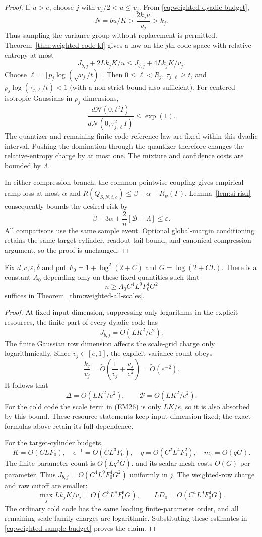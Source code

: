 \begin{proof}
If $u>e$, choose $j$ with $v_j/2<u\le v_j$. From
\eqref{eq:weighted-dyadic-budget},
\[
 N=bu/K>\frac{2k_j u}{v_j}>k_j.
\]
Thus sampling the variance group without replacement is permitted.
Theorem~\ref{thm:weighted-code-kl} gives a law on the $j$th code space
with relative entropy at most
\[
 J_{b,j}+2Lk_jK/u
 \le J_{b,j}+4Lk_jK/v_j.
\]
Choose $\ell=\lfloor p_j\log(\sqrt{v_j}/t)\rfloor$.
Then $0\le\ell<R_j$, $\tau_{j,\ell}\ge t$, and
$p_j\log(\tau_{j,\ell}/t)<1$ (with a non-strict bound also sufficient).
For centered isotropic Gaussians in $p_j$ dimensions,
\[
 \frac{d\mathcal N(0,t^2I)}
      {d\mathcal N(0,\tau_{j,\ell}^2I)}\le\exp(1).
\]
The quantizer and remaining finite-code reference law are fixed within
this dyadic interval. Pushing the domination through the quantizer
therefore changes the relative-entropy charge by at most one. The
mixture and confidence costs are bounded by $\Lambda$.

In either compression branch, the common pointwise coupling gives
empirical ramp loss at most $\alpha$ and
$R(Q_{S,N,t,c})\le\beta+\alpha+R_\psi(\Gamma)$.
Lemma~\ref{lem:si-risk} consequently bounds the desired risk by
\[
 \beta+3\alpha+\frac2n[\mathcal B+\Lambda]
 \le\varepsilon.
\]
All comparisons use the same sample event. Optional global-margin
conditioning retains the same target cylinder, readout-tail bound,
and canonical compression argument, so the proof is unchanged.
\end{proof}

\begin{corollary}
\label{cor:weighted-powers}
Fix $d,c,\varepsilon,\delta$ and put
$F_0=1+\log^2(2+C)$ and $G=\log(2+CL)$.
There is a constant $A_0$ depending only on these fixed quantities such
that
\[
 n\ge A_0 C^4L^9F_0^4G^2
\]
suffices in Theorem~\ref{thm:weighted-all-scales}.
\end{corollary}
\begin{proof}
At fixed input dimension, suppressing only logarithms in the explicit
resources, the finite part of every dyadic code has
\[
 J_{b,j}=\widetilde O(LK^2/e^2).
\]
The finite Gaussian row dimension affects the scale-grid charge only
logarithmically. Since $v_j\in[e,1]$, the explicit variance count obeys
\[
 \frac{k_j}{v_j}
 =\widetilde O\left(\frac1{v_j}+\frac{v_j}{e^2}\right)
 =\widetilde O(e^{-2}).
\]
It follows that
\[
 \Delta=\widetilde O(LK^2/e^2),\qquad
 \mathcal B=\widetilde O(LK^2/e^2).
\]
For the cold code the scale term in (EM26) is only $LK/e$, so it is
also absorbed by this bound. These resource statements keep input
dimension fixed; the exact formulas above retain its full dependence.

For the target-cylinder budgets,
\[
 K=O(CLF_0),\quad e^{-1}=O(CL^3F_0),\quad
 q=O(C^2L^4F_0^2),\quad m_b=O(qG).
\]
The finite parameter count is $O(Lq^2G)$, and its scalar mesh costs
$O(G)$ per parameter. Thus
$J_{b,j}=O(C^4L^9F_0^4G^2)$ uniformly in $j$.
The weighted-row charge and raw cutoff are smaller:
\[
 \max_j Lk_jK/v_j=O(C^3L^8F_0^3G),\qquad
 LD_0=O(C^4L^9F_0^4G).
\]
The ordinary cold code has the same leading finite-parameter order,
and all remaining scale-family charges are logarithmic. Substituting
these estimates in \eqref{eq:weighted-sample-budget} proves the claim.
\end{proof}
